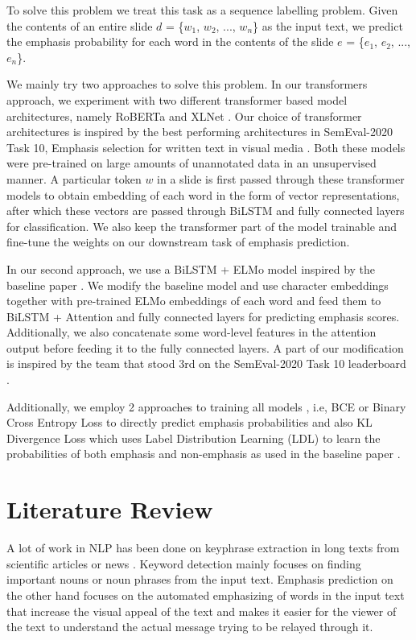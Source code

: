\documentclass[letterpaper]{article} %
\begin{document}
To solve this problem we treat this task as a sequence labelling problem. Given the contents of an entire slide $d$ = \{$w_1$, $w_2$, ..., $w_n$\} as the input text, we predict the emphasis probability for each word in the contents of the slide $e$ = \{$e_1$, $e_2$, ..., $e_n$\}.

We mainly try two approaches to solve this problem. In our transformers approach, we experiment with two different transformer based model architectures, namely RoBERTa \citep{liu2019RoBERTa} and XLNet \citep{yang2019XLNet}. Our choice of transformer architectures is inspired by the best performing architectures in SemEval-2020 Task 10, Emphasis selection for written text in visual media \citep{singhal2020iitk,anand2020midas}. Both these models were pre-trained on large amounts of unannotated data in an unsupervised manner. A particular token $w$ in a slide is first passed through these transformer models to obtain  embedding of each word in the form of vector representations, after which these vectors are passed through BiLSTM and fully connected layers for classification. We also keep the transformer part of the model trainable and fine-tune the weights on our downstream task of emphasis prediction.

In our second approach, we use a BiLSTM + ELMo  model inspired by the baseline paper \citep{shirani2019learning}. We modify the baseline model and use character embeddings together with pre-trained ELMo embeddings of each word and feed them to BiLSTM + Attention and fully connected layers for predicting emphasis scores. Additionally, we also concatenate some word-level features in the attention output before feeding it to the fully connected layers. A part of our modification is inspired by the team that stood 3rd on the SemEval-2020  Task  10 leaderboard \citep{singhal2020iitk}.

Additionally, we employ 2 approaches to training all models , i.e, BCE or Binary Cross Entropy Loss to directly predict emphasis probabilities and also KL Divergence Loss \citep{kullback1951information} which uses Label Distribution Learning (LDL) \citep{geng2016label} to learn the probabilities of both emphasis and non-emphasis as used in the baseline paper \citep{shirani2019learning}.

\section{Literature Review}
A lot of work in NLP has been done on keyphrase extraction in long texts from scientific articles or news \citep{augenstein2017semeval,zhang2016keyphrase}. Keyword detection mainly focuses on finding important nouns or noun phrases from the input text. Emphasis prediction on the other hand focuses on the automated emphasizing of words in the input text that increase the visual appeal of the text and makes it easier for the viewer of the text to understand the actual message trying to be relayed through it.
\end{document}
